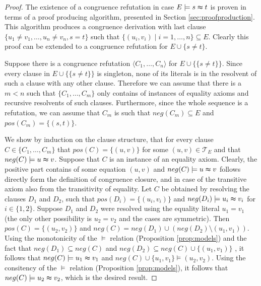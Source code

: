 \begin{proof}

The existence of a congruence refutation in case $E \models s \thickapprox t$ is proven in terms of a proof producing algorithm, presented in Section \ref{sec:proofproduction}.
This algorithm produces a congruence derivation with last clause $\{u_1 \neq v_1,\ldots,u_n \neq v_n, s = t\}$ such that $\{(u_i,v_i) \mid i = 1,\ldots,n\} \subseteq E$.
Clearly this proof can be extended to a congruence refutation for $E \cup \{ s \neq t\}$.

Suppose there is a congruence refutation $\langle C_1, \ldots, C_n \rangle$ for $E \cup \{\{ s \neq t\}\}$.
Since every clause in $E \cup \{\{ s \neq t\}\}$ is singleton, none of its literals is in the resolvent of such a clause with any other clause.
Therefore we can assume that there is a $m < n$ such that $\{C_1, \ldots, C_m\}$ only contains of instances of equality axioms and recursive resolvents of such clauses.
Furthermore, since the whole sequence is a refutation, we can assume that $C_m$ is such that $neg(C_m) \subseteq E$ and $pos(C_m) = \{(s,t)\}$.

We show by induction on the clause structure, that for every clause $C \in \{C_1,\ldots,C_m\}$ that $pos(C) = \{(u,v)\}$ for some $(u,v) \in \mathcal{T}_E$ and that $neg(C) \models u \thickapprox v$.
Suppose that $C$ is an instance of an equality axiom. Clearly, the positive part contains of some equation $(u,v)$ and $neg(C) \models u \thickapprox v$ follows directly form the definition of congruence closure, and in case of the transitive axiom also from the transitivity of equality.
Let $C$ be obtained by resolving the clauses $D_1$ and $D_2$, such that $pos(D_i) = \{(u_i,v_i)\}$ and $neg(D_i) \models u_i \thickapprox v_i$ for $i \in \{1,2\}$.
Suppose $D_1$ and $D_2$ were resolved using the equality literal $u_1 = v_1$ (the only other possibility is $u_2 = v_2$ and the cases are symmetric).
Then $pos(C) = \{(u_2,v_2)\}$ and $neg(C) = neg(D_1) \cup (neg(D_2) \setminus (u_1,v_1))$.
Using the monotonicity of the $\models$ relation (Proposition \ref{prop:models}) and the fact that $neg(D_1) \subseteq neg(C)$ and $neg(D_2) \subseteq neg(C) \cup \{(u_1,v_1)\}$ , it follows that $neg(C) \models u_1 \thickapprox v_1$ and $neg(C) \cup \{u_1,v_1\} \models (u_2,v_2)$.
Using the consitency of the $\models$ relation (Proposition \ref{prop:models}), it follows that $neg(C) \models u_2 \thickapprox v_2$, which is the desired result.

\end{proof}